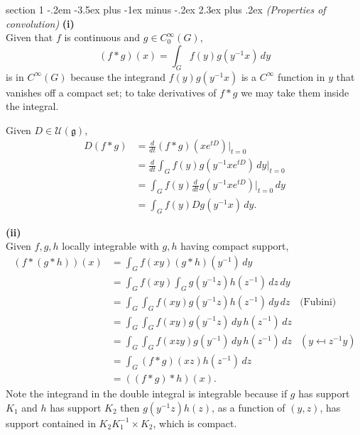 \documentclass[12pt]{article}
\makeatletter
\theoremstyle{norm}
\newcommand{\fg}[0]{\mathfrak{g}}
\providecommand{\cal}[1]{\mathcal{#1}}
\renewcommand{\cal}[1]{\mathcal{#1}}
\newcommand{\subprob}[1]{\noindent\textbf{#1}\\}
\newcommand{\iy}[0]{\infty}
\newenvironment{problem}{\@startsection
       {section}
       {1}
       {-.2em}
       {-3.5ex plus -1ex minus -.2ex}
       {2.3ex plus .2ex}
       {\pagebreak[3]%
       \large\bf\noindent{Problem }
       }
       }
       {%
       }
\makeatother
\begin{document}
\begin{problem}{\it (Properties of convolution)}
\subprob{(i)}
Given that $f$ is continuous and $g\in C_0^{\iy}(G)$, 
\[
(f*g)(x)=\int_G f(y)g(y^{-1}x)\,dy
\]
is in $C^{\iy}(G)$ because the integrand $f(y)g(y^{-1}x)$ is a $C^{\iy}$ function in $y$ that vanishes off a compact set; to take derivatives of $f*g$ we may take them inside the integral.

Given $D\in \cal U(\fg)$,
\begin{align*}
D(f*g)&=\frac{d}{dt}(f*g)(xe^{tD})|_{t=0}\\
&=\frac{d}{dt}\int_G f(y)g(y^{-1}xe^{tD})\,dy|_{t=0}\\
&=\int_G f(y) \frac{d}{dt} g(y^{-1}xe^{tD})|_{t=0}\,dy\\
&=\int_G f(y)Dg(y^{-1}x)\,dy.
\end{align*}

\subprob{(ii)}
Given $f,g,h$ locally integrable with $g,h$ having compact support,
\begin{align*}
(f*(g*h))(x)&=\int_G f(xy)(g*h)(y^{-1})\,dy\\
&=\int_G f(xy)\int_G g(y^{-1}z)h(z^{-1})\,dz\,dy\\
&=\int_G \int_G f(xy) g(y^{-1}z)h(z^{-1})\,dy\,dz&\text{(Fubini)}\\
&=\int_G \int_G f(xy)g(y^{-1}z)\,dy\,h(z^{-1}) \,dz\\
&=\int_G \int_G f(xzy)g(y^{-1})\,dy\,h(z^{-1}) \,dz&(y\mapsfrom z^{-1}y)\\
&=\int_G (f*g)(xz)h(z^{-1})\,dz\\
&=((f*g)*h)(x).
\end{align*}
Note the integrand in the double integral is integrable because if $g$ has support $K_1$ and $h$ has support $K_2$ then $g(y^{-1}z)h(z)$, as a function of $(y,z)$, has support contained in $K_2K_1^{-1}\times K_2$, which is compact.
\end{problem}
\end{document}
